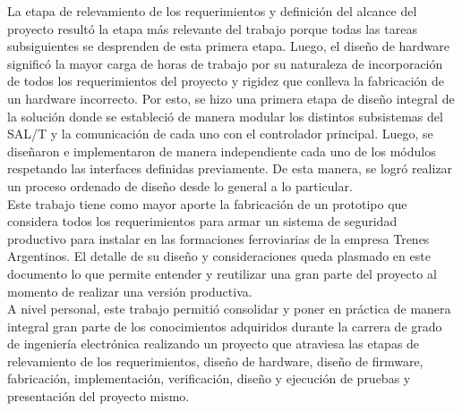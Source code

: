 La etapa de relevamiento de los requerimientos y definición del alcance del proyecto resultó la etapa más relevante del trabajo porque todas las tareas subsiguientes se desprenden de esta primera etapa. Luego, el diseño de hardware significó la mayor carga de horas de trabajo por su naturaleza de incorporación de todos los requerimientos del proyecto y rigidez que conlleva la fabricación de un hardware incorrecto. Por esto, se hizo una primera etapa de diseño integral de la solución donde se estableció de manera modular los distintos subsistemas del SAL/T y la comunicación de cada uno con el controlador principal. Luego, se diseñaron e implementaron de manera independiente cada uno de los módulos respetando las interfaces definidas previamente. De esta manera, se logró realizar un proceso ordenado de diseño desde lo general a lo particular. \\ 

Este trabajo tiene como mayor aporte la fabricación de un prototipo que considera todos los requerimientos para armar un sistema de seguridad productivo para instalar en las formaciones ferroviarias de la empresa Trenes Argentinos. El detalle de su diseño y consideraciones queda plasmado en este documento lo que permite entender y reutilizar una gran parte del proyecto al momento de realizar una versión productiva. \\

A nivel personal, este trabajo permitió consolidar y poner en práctica de manera integral gran parte de los conocimientos adquiridos durante la carrera de grado de ingeniería electrónica realizando un proyecto que atraviesa las etapas de relevamiento de los requerimientos, diseño de hardware, diseño de firmware, fabricación, implementación, verificación, diseño y ejecución de pruebas y presentación del proyecto mismo.